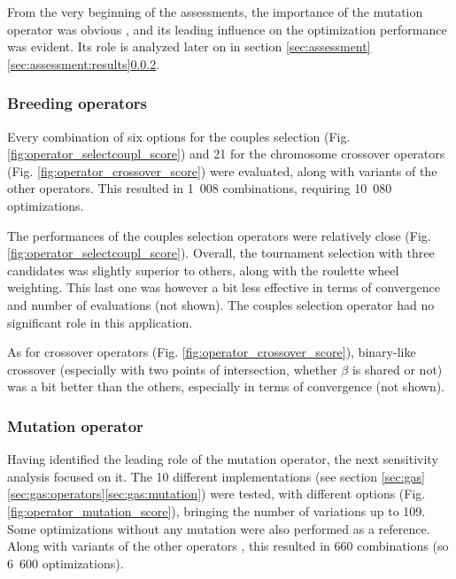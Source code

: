 \documentclass{ametsoc}
\begin{document}
From the very beginning of the assessments, the importance of the mutation operator was obvious \cite[see][for the details]{Horton2012a}, and its leading influence on the optimization performance was evident. Its role is analyzed later on in section \ref{sec:assessment}\ref{sec:assessment:results}\ref{sec:assessment:mutation}.

\subsubsection{Breeding operators}

Every combination of six options for the couples selection (Fig. \ref{fig:operator_selectcoupl_score}) and 21 for the chromosome crossover operators (Fig. \ref{fig:operator_crossover_score}) were evaluated, along with variants of the other operators. This resulted in 1~008 combinations, requiring 10~080 optimizations.

The performances of the couples selection operators were relatively close (Fig. \ref{fig:operator_selectcoupl_score}). Overall, the tournament selection with three candidates was slightly superior to others, along with the roulette wheel weighting. This last one was however a bit less effective in terms of convergence and number of evaluations (not shown). The couples selection operator had no significant role in this application. 

As for crossover operators (Fig. \ref{fig:operator_crossover_score}), binary-like crossover (especially with two points of intersection, whether $\beta$ is shared or not) was a bit better than the others, especially in terms of convergence (not shown).
	

\subsubsection{Mutation operator}
\label{sec:assessment:mutation}

Having identified the leading role of the mutation operator, the next sensitivity analysis focused on it. The 10 different implementations (see section \ref{sec:gas}\ref{sec:gas:operators}\ref{sec:gas:mutation}) were tested, with different options (Fig. \ref{fig:operator_mutation_score}), bringing the number of variations up to 109. Some optimizations without any mutation were also performed as a reference. Along with variants of the other operators \citep[see][for the details]{Horton2012a}, this resulted in 660 combinations (so 6~600 optimizations).
\end{document}

